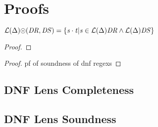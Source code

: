 \section{Proofs}



\begin{lemma}
$\mathcal{L}(\Delta){\odot(\mathit{DR},\mathit{DS})}=
\{\mathit{s}\cdot\mathit{t}|\mathit{s}\in\mathcal{L}(\Delta){\mathit{DR}}\wedge\mathcal{L}(\Delta){\mathit{DS}}\}$
\begin{proof}
\end{proof}
\end{lemma}

\dnfrs*
\begin{proof}
pf of soundness of dnf regexs
\end{proof}

\subsection{DNF Lens Completeness}
\dnflc*

\subsection{DNF Lens Soundness}

